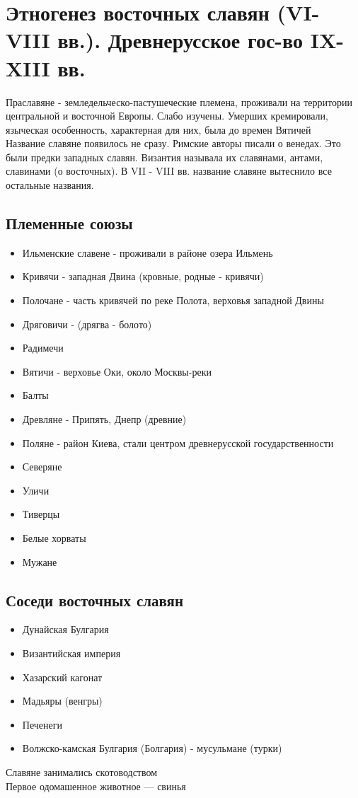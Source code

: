 \documentclass[a4paper, 11pt, oneside]{article}
\begin{document}
\section{Этногенез восточных славян (VI-VIII вв.). Древнерусское гос-во IX-XIII вв.}

Праславяне - земледельческо-пастушеческие племена, проживали на территории центральной и восточной Европы. Слабо изучены. Умерших кремировали, языческая особенность, характерная для них, была до времен Вятичей\\
Название славяне появилось не сразу. Римские авторы писали о венедах. Это были предки западных славян. Византия называла их славянами, антами, славинами (о восточных). В VII - VIII вв. название славяне вытеснило все остальные названия. 
\subsection{Племенные союзы}
\begin{itemize}
	\item Ильменские славене - проживали в районе озера Ильмень
	\item Кривячи - западная Двина (кровные, родные - кривячи)
	\item Полочане - часть кривячей по реке Полота, верховья западной Двины
	\item Дряговичи - (дрягва - болото)
	\item Радимечи
	\item Вятичи - верховье Оки, около Москвы-реки
	\item Балты
	\item Древляне - Припять, Днепр (древние)
	\item Поляне - район Киева, стали центром древнерусской государственности
	\item Северяне
	\item Уличи
	\item Тиверцы
	\item Белые хорваты
	\item Мужане
\end{itemize}

\subsection{Соседи восточных славян}
\begin{itemize}
	\item Дунайская Булгария
	\item Византийская империя
	\item Хазарский кагонат
	\item Мадьяры (венгры)
	\item Печенеги
	\item Волжско-камская Булгария (Болгария) - мусульмане (турки)
\end{itemize}
Славяне занимались скотоводством\\
Первое одомашенное животное --- свинья
\newpage
\end{document}
